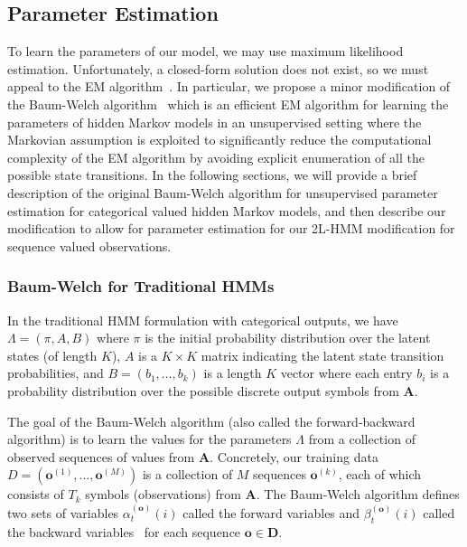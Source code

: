 \subsection{Parameter Estimation}
\label{sec:param-estimation}
To learn the parameters of our model, we may use maximum likelihood
estimation. Unfortunately, a closed-form solution does not exist, so we
must appeal to the EM algorithm~\cite{Dempster:1977:JRSS}. In particular,
we propose a minor modification of the Baum-Welch
algorithm~\cite{Rabiner:1990:RSR} which is an efficient EM algorithm for
learning the parameters of hidden Markov models in an unsupervised setting
where the Markovian assumption is exploited to significantly reduce the
computational complexity of the EM algorithm by avoiding explicit
enumeration of all the possible state transitions.  In the following
sections, we will provide a brief description of the original Baum-Welch
algorithm for unsupervised parameter estimation for categorical valued
hidden Markov models, and then describe our modification to allow for
parameter estimation for our 2L-HMM modification for sequence valued
observations.

\subsubsection{Baum-Welch for Traditional HMMs}
In the traditional HMM formulation with categorical outputs, we have
$\Lambda = (\pi, A, B)$ where $\pi$ is the initial probability distribution
over the latent states (of length $K$), $A$ is a $K\times K$ matrix
indicating the latent state transition probabilities, and $B = (b_1,
\ldots, b_k)$ is a length $K$ vector where each entry $b_i$ is a
probability distribution over the possible discrete output symbols from
$\mathbf{A}$.

The goal of the Baum-Welch algorithm (also called the forward-backward
algorithm) is to learn the values for the parameters $\Lambda$ from a
collection of observed sequences of values from $\mathbf{A}$. Concretely,
our training data $D = (\mathbf{o}^{(1)}, \ldots, \mathbf{o}^{(M)})$ is a
collection of $M$ sequences $\mathbf{o}^{(k)}$, each of which consists of $T_k$
symbols (observations) from $\mathbf{A}$. The Baum-Welch algorithm defines
two sets of variables $\alpha^{(\mathbf{o})}_t(i)$ called the forward
variables and $\beta^{(\mathbf{o})}_t(i)$ called the backward
variables~\cite{Rabiner:1990:RSR} for each sequence $\mathbf{o} \in
\mathbf{D}$.

